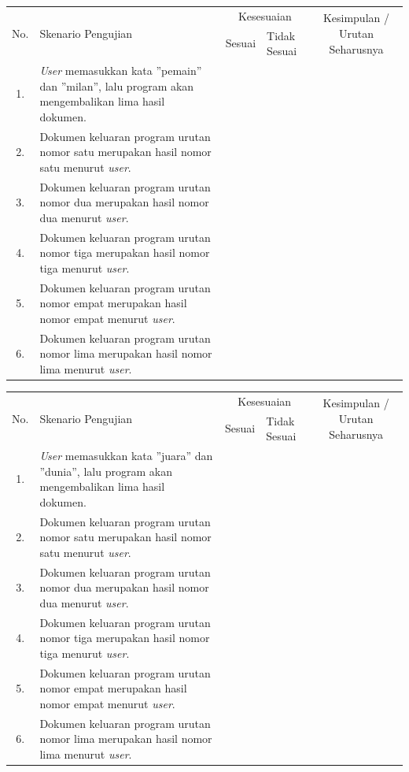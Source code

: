 \documentclass[12pt]{report}
\begin{document}
\begin{center}
\begin{tabular}{ |c|    m{6cm}         |c|m{1cm}| c |  }
\hline
\multirow{2}{*}{No.} & \multirow{2}{6cm}{Skenario Pengujian} & \multicolumn{2}{c|}{Kesesuaian} &\multirow{2}{2.3cm}{Kesimpulan / Urutan Seharusnya} \\\cline{3-4}
	&			& Sesuai	&	Tidak Sesuai   	&		\\
 \hline
  1.&\textit{User} memasukkan kata ''pemain'' dan ''milan'', lalu program akan mengembalikan lima hasil dokumen.&	&	& \\
\hline
 2.&Dokumen keluaran program urutan nomor satu merupakan hasil nomor satu menurut \textit{user}.&	&	& \\
 \hline
 3.&Dokumen keluaran program urutan nomor dua merupakan hasil nomor dua menurut \textit{user}.&	&	& \\
 \hline
 4.&Dokumen keluaran program urutan nomor tiga merupakan hasil nomor tiga menurut \textit{user}.&	&	& \\
 \hline
5.&Dokumen keluaran program urutan nomor empat merupakan hasil nomor empat menurut \textit{user}.&	&	& \\
 \hline
6.&Dokumen keluaran program urutan nomor lima merupakan hasil nomor lima menurut \textit{user}.&	&	& \\
 \hline
\end{tabular}
  \end{center}


\begin{center}
\begin{tabular}{ |c|    m{6cm}         |c|m{1cm}| c |  }
\hline
\multirow{2}{*}{No.} & \multirow{2}{6cm}{Skenario Pengujian} & \multicolumn{2}{c|}{Kesesuaian} &\multirow{2}{2.3cm}{Kesimpulan / Urutan Seharusnya} \\\cline{3-4}
	&			& Sesuai	&	Tidak Sesuai   	&		\\
 \hline
  1.&\textit{User} memasukkan kata ''juara'' dan ''dunia'', lalu program akan mengembalikan lima hasil dokumen.&	&	& \\
\hline
 2.&Dokumen keluaran program urutan nomor satu merupakan hasil nomor satu menurut \textit{user}.&	&	& \\
 \hline
 3.&Dokumen keluaran program urutan nomor dua merupakan hasil nomor dua menurut \textit{user}.&	&	& \\
 \hline
 4.&Dokumen keluaran program urutan nomor tiga merupakan hasil nomor tiga menurut \textit{user}.&	&	& \\
 \hline
5.&Dokumen keluaran program urutan nomor empat merupakan hasil nomor empat menurut \textit{user}.&	&	& \\
 \hline
6.&Dokumen keluaran program urutan nomor lima merupakan hasil nomor lima menurut \textit{user}.&	&	& \\
 \hline
\end{tabular}
  \end{center}
\end{document}
